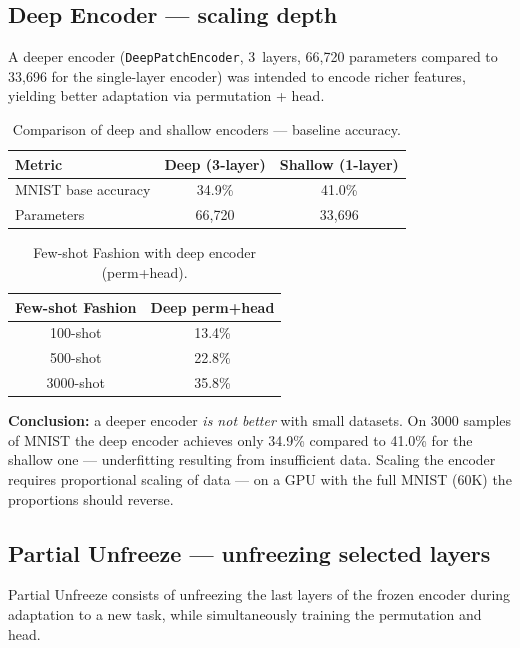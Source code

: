 \documentclass[11pt,a4paper]{report}
\begin{document}
\subsection{Deep Encoder --- scaling depth}

A deeper encoder (\texttt{DeepPatchEncoder}, 3~layers, 66,720 parameters compared to 33,696
for the single-layer encoder) was intended to encode richer features, yielding better adaptation
via permutation + head.

\begin{table}[h!]
\centering
\caption{Comparison of deep and shallow encoders --- baseline accuracy.}
\begin{tabular}{l c c}
\hline
\textbf{Metric} & \textbf{Deep (3-layer)} & \textbf{Shallow (1-layer)} \\
\hline
MNIST base accuracy & 34.9\% & 41.0\% \\
Parameters & 66,720 & 33,696 \\
\hline
\end{tabular}
\label{tab:deep_vs_shallow}
\end{table}

\begin{table}[h!]
\centering
\caption{Few-shot Fashion with deep encoder (perm+head).}
\begin{tabular}{c c}
\hline
\textbf{Few-shot Fashion} & \textbf{Deep perm+head} \\
\hline
100-shot & 13.4\% \\
500-shot & 22.8\% \\
3000-shot & 35.8\% \\
\hline
\end{tabular}
\label{tab:deep_fewshot}
\end{table}

\textbf{Conclusion:} a deeper encoder \emph{is not better} with small datasets.
On 3000 samples of MNIST the deep encoder achieves only 34.9\% compared to 41.0\% for the shallow one ---
underfitting resulting from insufficient data.
Scaling the encoder requires proportional scaling of data ---
on a GPU with the full MNIST (60K) the proportions should reverse.

\subsection{Partial Unfreeze --- unfreezing selected layers}

Partial Unfreeze consists of unfreezing the last layers of the frozen encoder
during adaptation to a new task, while simultaneously training the permutation and head.
\end{document}
